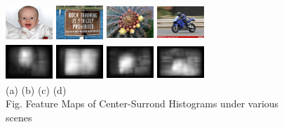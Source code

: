 \documentclass[10pt,twocolumn,letterpaper]{article}
\newcommand{\hs}{\hspace{0.58in}}
\begin{document}
\begin{figure}
    \begin{center}
    \includegraphics[width=0.7in,height=0.54in]{./Figures/CSH_image/1orig.jpg}
    \includegraphics[width=0.7in,height=0.54in]{./Figures/CSH_image/2orig.jpg}
    \includegraphics[width=0.7in,height=0.54in]{./Figures/CSH_image/3orig.jpg}
    \includegraphics[width=0.7in,height=0.54in]{./Figures/CSH_image/4orig.jpg}\\
    \includegraphics[width=0.7in,height=0.54in]{./Figures/CSH_image/1cont.jpg}
    \includegraphics[width=0.7in,height=0.54in]{./Figures/CSH_image/2cont.jpg}
    \includegraphics[width=0.7in,height=0.54in]{./Figures/CSH_image/3cont.jpg}
    \includegraphics[width=0.7in,height=0.54in]{./Figures/CSH_image/4cont.jpg}\\
    \footnotesize \hspace{0.1cm} (a) \hs (b) \hs  (c) \hs (d) \\
    Fig. Feature Maps of Center-Surrond Histograms under various scenes
    \end{center}
\end{figure}
\end{document}
